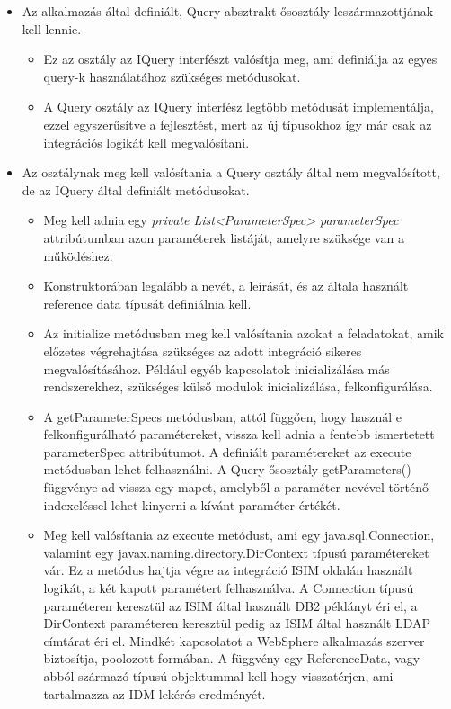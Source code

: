 \begin{itemize}
	\item Az alkalmazás által definiált, Query absztrakt ősosztály leszármazottjának kell lennie.
	\begin{itemize}
		\item Ez az osztály az IQuery interfészt valósítja meg, ami definiálja az egyes query-k használatához szükséges metódusokat.
		\item A Query osztály az IQuery interfész legtöbb metódusát implementálja, ezzel egyszerűsítve a fejlesztést, mert az új típusokhoz így már csak az integrációs logikát kell megvalósítani.
		
	\end{itemize}
	\item Az osztálynak meg kell valósítania a Query osztály által nem megvalósított, de az IQuery által definiált metódusokat.
	\begin{itemize}
		\item Meg kell adnia egy \textit{private List<ParameterSpec> parameterSpec} attribútumban azon paraméterek listáját, amelyre szüksége van a működéshez.
		\item Konstruktorában legalább a nevét, a leírását, és az általa használt reference data típusát definiálnia kell.
		\item Az initialize metódusban meg kell valósítania azokat a feladatokat, amik előzetes végrehajtása szükséges az adott integráció sikeres megvalósításához. Például egyéb kapcsolatok inicializálása más rendszerekhez, szükséges külső modulok inicializálása, felkonfigurálása.
		\item A getParameterSpecs metódusban, attól függően, hogy használ e felkonfigurálható paramétereket, vissza kell adnia a fentebb ismertetett parameterSpec attribútumot. A definiált paramétereket az execute metódusban lehet felhasználni. A Query ősosztály getParameters() függvénye ad vissza egy mapet, amelyből a paraméter nevével történő indexeléssel lehet kinyerni a kívánt paraméter értékét.
		\item Meg kell valósítania az execute metódust, ami egy java.sql.Connection, valamint egy javax.naming.directory.DirContext típusú paramétereket vár. Ez a metódus hajtja végre az integráció ISIM oldalán használt logikát, a két kapott paramétert felhasználva. A Connection típusú paraméteren keresztül az ISIM által használt DB2 példányt éri el, a DirContext paraméteren keresztül pedig az ISIM által használt LDAP címtárat éri el. Mindkét kapcsolatot a WebSphere alkalmazás szerver biztosítja, poolozott formában. A függvény egy ReferenceData, vagy abból származó típusú objektummal kell hogy visszatérjen, ami tartalmazza az IDM lekérés eredményét.
	\end{itemize}
\end{itemize} 

